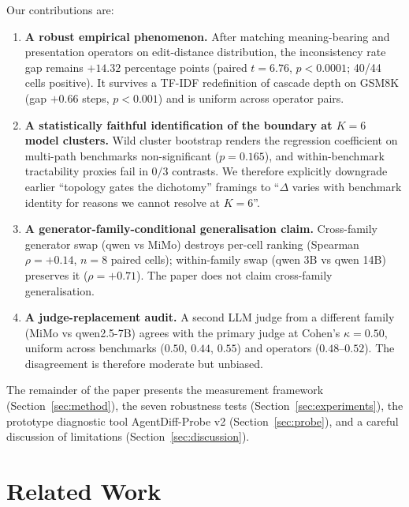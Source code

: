 \documentclass[11pt]{article}
\begin{document}
Our contributions are:
\begin{enumerate}
    \item \textbf{A robust empirical phenomenon.} After matching meaning-bearing and presentation operators on edit-distance distribution, the inconsistency rate gap remains $+14.32$ percentage points (paired $t=6.76$, $p<0.0001$; 40/44 cells positive). It survives a TF-IDF redefinition of cascade depth on GSM8K (gap $+0.66$ steps, $p<0.001$) and is uniform across operator pairs.
    \item \textbf{A statistically faithful identification of the boundary at $K=6$ model clusters.} Wild cluster bootstrap renders the regression coefficient on multi-path benchmarks non-significant ($p=0.165$), and within-benchmark tractability proxies fail in $0/3$ contrasts. We therefore explicitly downgrade earlier ``topology gates the dichotomy'' framings to ``$\Delta$ varies with benchmark identity for reasons we cannot resolve at $K=6$''.
    \item \textbf{A generator-family-conditional generalisation claim.} Cross-family generator swap (qwen vs MiMo) destroys per-cell ranking (Spearman $\rho=+0.14$, $n=8$ paired cells); within-family swap (qwen 3B vs qwen 14B) preserves it ($\rho=+0.71$). The paper does not claim cross-family generalisation.
    \item \textbf{A judge-replacement audit.} A second LLM judge from a different family (MiMo vs qwen2.5-7B) agrees with the primary judge at Cohen's $\kappa=0.50$, uniform across benchmarks ($0.50$, $0.44$, $0.55$) and operators ($0.48$--$0.52$). The disagreement is therefore moderate but unbiased.
\end{enumerate}

The remainder of the paper presents the measurement framework (Section~\ref{sec:method}), the seven robustness tests (Section~\ref{sec:experiments}), the prototype diagnostic tool AgentDiff-Probe v2 (Section~\ref{sec:probe}), and a careful discussion of limitations (Section~\ref{sec:discussion}).

\section{Related Work}
\end{document}

